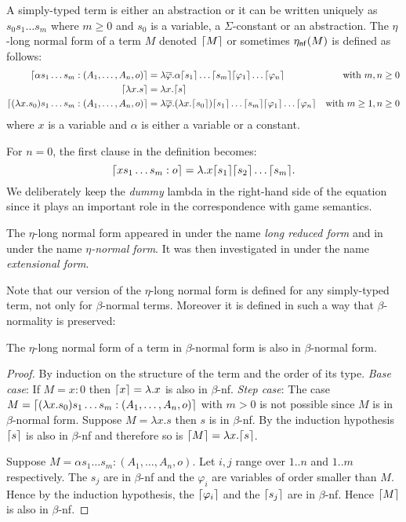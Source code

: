 \begin{dfn}
A simply-typed term is either an abstraction or it can be written uniquely as
$s_0 s_1 \ldots s_m$ where $m\geq0$ and $s_0$ is a variable, a $\Sigma$-constant or an abstraction.
The $\eta$-long normal form of a term $M$ denoted $\lceil M\rceil$ or sometimes $\eta_{\sf nf}(M)$
is defined as follows:
\begin{align*}
\lceil \alpha s_1 \ldots s_m : (A_1,\ldots,A_n,o)\rceil &= \lambda \overline{\varphi} . \alpha \lceil s_1\rceil\ldots \lceil s_m\rceil \lceil \varphi_1\rceil \ldots \lceil \varphi_n\rceil
& \mbox{with $m,n\geq0$}\\
\lceil \lambda x . s \rceil &= \lambda x . \lceil s\rceil \\
\lceil (\lambda x . s_0) s_1 \ldots s_m : (A_1,\ldots,A_n,o) \rceil &= \lambda \overline{\varphi} . (\lambda x . \lceil s_0\rceil) \lceil s_1\rceil \ldots \lceil s_m\rceil \lceil \varphi_1\rceil \ldots \lceil \varphi_n\rceil
& \mbox{with $m\geq 1,n\geq0$}
\end{align*}
where $x$ is a variable and $\alpha$ is either a variable or a constant.
\end{dfn}

For $n=0$, the first clause in the definition becomes:
$$\lceil x s_1 \ldots s_m : o\rceil = \lambda . x \lceil s_1\rceil \lceil s_2\rceil \ldots \lceil s_m\rceil.$$
We deliberately keep the \textsl{dummy} lambda in the right-hand side of the equation since it
plays an important role in the correspondence with game semantics.

The $\eta$-long normal form appeared in \citep{DBLP:journals/tcs/JensenP76}
under the name \emph{long reduced form}
and in \citep{DBLP:journals/tcs/Huet75}
under the name \emph{$\eta$-normal form}. It was then investigated in \citep{huet76}
under the name \emph{extensional form}.

Note that our version of the $\eta$-long normal form is defined for any simply-typed term, not only for $\beta$-normal terms.
Moreover it is defined in such a way that $\beta$-normality is preserved:
\begin{lem}
The $\eta$-long normal form of a term in $\beta$-normal form is also in $\beta$-normal form.
\end{lem}
\begin{proof}
By induction on the structure of the term and the order of its type.
\emph{Base case}:
If $M=x:0$ then $\lceil x\rceil = \lambda . x$ is also in $\beta$-nf.
\emph{Step case}:
The case $M = \lceil (\lambda x . s_0) s_1 \ldots s_m : (A_1,\ldots,A_n,o)\rceil$ with $m>0$ is not possible since $M$ is in
$\beta$-normal form.
Suppose $M = \lambda x . s$ then $s$ is in $\beta$-nf. By the induction hypothesis $\lceil s\rceil$ is also in $\beta$-nf and therefore
so is $\lceil M\rceil = \lambda x . \lceil s\rceil$.

Suppose $M= \alpha s_1 \ldots s_m : (A_1,\ldots,A_n,o)$. Let $i,j$ range over $1..n$ and $1..m$ respectively.
The $s_j$ are in $\beta$-nf and the $\varphi_i$ are variables of order smaller than $M$. Hence by the induction hypothesis,
the $\lceil \varphi_i\rceil$ and the $\lceil s_j\rceil$ are in $\beta$-nf.
Hence $\lceil M\rceil$ is also in $\beta$-nf.
\end{proof}


